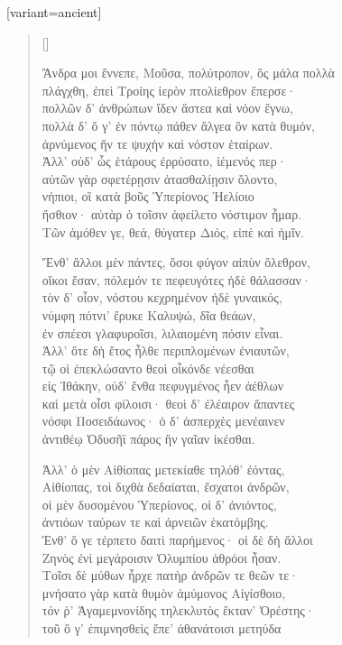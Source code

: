 \documentclass[10pt]{article}
\begin{document}
\begin{greek}[variant=ancient]
\renewcommand{\poemtoc}{section}
\settowidth{\versewidth}{Ἄνδρα μοι ἔννεπε, Μοῦσα, πολύτροπον, ὃς μάλα πολλὰ}
\begin{verse}[\versewidth]

Ἄνδρα μοι ἔννεπε, Μοῦσα, πολύτροπον, ὃς μάλα πολλὰ\\
πλάγχθη, ἐπεὶ Τροίης ἱερὸν πτολίεθρον ἔπερσε·\\
πολλῶν δ' ἀνθρώπων ἴδεν ἄστεα καὶ νόον ἔγνω,\\
πολλὰ δ' ὅ γ' ἐν πόντῳ πάθεν ἄλγεα ὃν κατὰ θυμόν,\\
ἀρνύμενος ἥν τε ψυχὴν καὶ νόστον ἑταίρων.\\
Ἀλλ' οὐδ' ὧς ἑτάρους ἐρρύσατο, ἱέμενός περ·\\
αὐτῶν γὰρ σφετέρῃσιν ἀτασθαλίῃσιν ὄλοντο,\\
νήπιοι, οἳ κατὰ βοῦς Ὑπερίονος Ἠελίοιο\\
ἤσθιον· αὐτὰρ ὁ τοῖσιν ἀφείλετο νόστιμον ἦμαρ.\\
Τῶν ἁμόθεν γε, θεά, θύγατερ Διός, εἰπὲ καὶ ἡμῖν.

Ἔνθ' ἄλλοι μὲν πάντες, ὅσοι φύγον αἰπὺν ὄλεθρον,\\
οἴκοι ἔσαν, πόλεμόν τε πεφευγότες ἠδὲ θάλασσαν·\\
τὸν δ' οἶον, νόστου κεχρημένον ἠδὲ γυναικός,\\
νύμφη πότνι' ἔρυκε Καλυψώ, δῖα θεάων,\\
ἐν σπέεσι γλαφυροῖσι, λιλαιομένη πόσιν εἶναι.\\
Ἀλλ' ὅτε δὴ ἔτος ἦλθε περιπλομένων ἐνιαυτῶν,\\
τῷ οἱ ἐπεκλώσαντο θεοὶ οἶκόνδε νέεσθαι\\
εἰς Ἰθάκην, οὐδ' ἔνθα πεφυγμένος ἦεν ἀέθλων\\
καὶ μετὰ οἷσι φίλοισι· θεοὶ δ' ἐλέαιρον ἅπαντες\\
νόσφι Ποσειδάωνος· ὁ δ' ἀσπερχὲς μενέαινεν\\
ἀντιθέῳ Ὀδυσῆϊ πάρος ἣν γαῖαν ἱκέσθαι.

Ἀλλ' ὁ μὲν Αἰθίοπας μετεκίαθε τηλόθ' ἐόντας,\\
Αἰθίοπας, τοὶ διχθὰ δεδαίαται, ἔσχατοι ἀνδρῶν,\\
οἱ μὲν δυσομένου Ὑπερίονος, οἱ δ' ἀνιόντος,\\
ἀντιόων ταύρων τε καὶ ἀρνειῶν ἑκατόμβης. \\
Ἐνθ' ὅ γε τέρπετο δαιτὶ παρήμενος· οἱ δὲ δὴ ἄλλοι\\
Ζηνὸς ἐνὶ μεγάροισιν Ὀλυμπίου ἁθρόοι ἦσαν.\\
Τοῖσι δὲ μύθων ἦρχε πατὴρ ἀνδρῶν τε θεῶν τε·\\
μνήσατο γὰρ κατὰ θυμὸν ἀμύμονος Αἰγίσθοιο,\\
τόν ῥ' Ἀγαμεμνονίδης τηλεκλυτὸς ἔκταν' Ὀρέστης· \\
τοῦ ὅ γ' ἐπιμνησθεὶς ἔπε' ἀθανάτοισι μετηύδα


\end{verse}
\end{greek}
\end{document}
